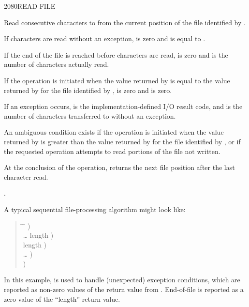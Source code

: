 \begin{worddef}{2080}{READ-FILE}
\item {}

	Read  consecutive characters to  from the
	current position of the file identified by .

	If  characters are read without an exception, 
	is zero and  is equal to .

	If the end of the file is reached before  characters are
	read,  is zero and  is the number of characters
	actually read.

	If the operation is initiated when the value returned by
	 is equal to the value returned by
	 for the file identified by ,
	 is zero and  is zero.

	If an exception occurs,  is the implementation-defined
	I/O result code, and  is the number of characters
	transferred to  without an exception.

	An ambiguous condition exists if the operation is initiated when
	the value returned by  is greater than the
	value returned by  for the file identified by
	, or if the requested operation attempts to read
	portions of the file not written.

	At the conclusion of the operation,  returns
	the next file position after the last character read.

\see {}.

	\begin{rationale} %
		A typical sequential file-processing algorithm might look like:
		\begin{quote}\ttfamily{}
			\begin{tabbing}
			\tab \= \hspace{12em} \= \kill
								\>\>  ) \\
			\> {\ldots}  
											\>	  length ) \\
			 		\>\> \word{p} length ) \\
			\> {\ldots}						\>	  ) \\
								\>\>  )
			\end{tabbing}
		\end{quote}

		In this example,  is used to handle
		(unexpected) exception conditions, which are reported as
		non-zero values of the  return value from
		. End-of-file is reported as a zero value of
		the ``length'' return value.
	\end{rationale}
\end{worddef}



